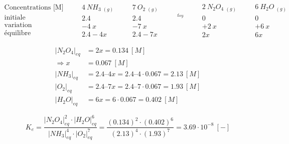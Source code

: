 \documentclass[
  11pt,
  a4paper,
  openany]{book}
\begin{document}
\begin{Answer}
\[
\begin{split}
  \text{Concentrations [M]} &\\
  \text{initiale} &\\
  \text{variation} &\\
  \text{équilibre} &
\end{split}
\quad
\begin{split}
  4\ NH_3\ _{(g)} &\\
  2.4 &\\
  -4\ x &\\
  2.4 - 4x &
\end{split}
\quad
\begin{split}
  7\ O_2\ _{(g)} &\\
  2.4 &\\
  -7\ x &\\
  2.4 - 7x &
\end{split}
\quad
\begin{split}
  \leftrightharpoons &\\
  ~ &\\
  ~ &\\
  ~ &
\end{split}
\quad
\begin{split}
  2\ N_2O_4\ _{(g)}\\
  0 &\\
  +2\ x &\\
  2x &
\end{split}
\quad
\begin{split}
  6\ H_2O\ _{(g)}\\
  0 &\\
  +6\ x &\\
  6x &
\end{split}
\]

\[
  \begin{split}
  |N_2O_4|_{eq} &= 2x = 0.134\ [M] \\
  \Rightarrow x &= 0.067\ [M] \\
  |NH_3|_{eq} &= 2.4 – 4x = 2.4 – 4 \cdot 0.067 = 2.13\ [M] \\ 
  |O_2|_{eq} &= 2.4 – 7x = 2.4 – 7 \cdot 0.067 = 1.93\ [M] \\ 
  |H_2O|_{eq} &= 6x = 6 \cdot 0.067 = 0.402\ [M]
  \end{split}
\]

\[
  K_{e} = \frac{|N_2O_4|^{2}_{eq} \cdot |H_2O|^{6}_{eq}}{|NH_3|^{4}_{eq} \cdot |O_2|^{7}_{eq}}
  = \frac{(0.134)^2 \cdot (0.402)^{6}}{(2.13)^{4} \cdot (1.93)^{7}} = 3.69 \cdot 10^{−8}\ [-]
\]

\end{Answer}
\end{document}
